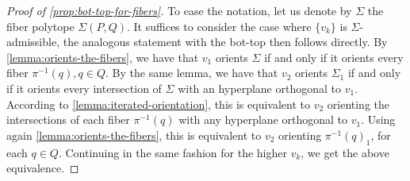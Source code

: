 \begin{proof}[Proof of \cref{prop:bot-top-for-fibers}]
	To ease the notation, let us denote by $\Sigma$ the fiber polytope $\Sigma(P,Q)$.
	It suffices to consider the case where $\{v_k\}$ is $\Sigma$-admissible, the analogous statement with the bot-top then follows directly.
	By \cref{lemma:orients-the-fibers}, we have that $v_1$ orients $\Sigma$ if and only if it orients every fiber $\pi^{-1}(q), q \in Q$.
	By the same lemma, we have that $v_2$ orients $\Sigma_1$ if and only if it orients every intersection of $\Sigma$ with an hyperplane orthogonal to $v_1$.
	According to \cref{lemma:iterated-orientation}, this is equivalent to $v_2$ orienting the intersections of each fiber $\pi^{-1}(q)$ with any hyperplane orthogonal to $v_1$.
	Using again \cref{lemma:orients-the-fibers}, this is equivalent to $v_2$ orienting $\pi^{-1}(q)_1$, for each $q \in Q$.
	Continuing in the same fashion for the higher $v_k$, we get the above equivalence.
\end{proof}
